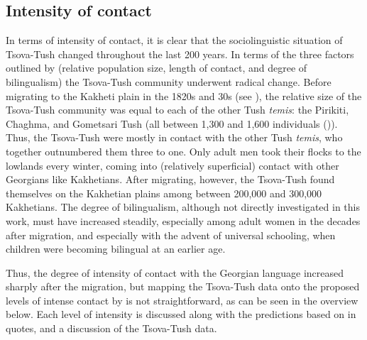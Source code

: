 \subsection{Intensity of contact}

In terms of intensity of contact, it is clear that the sociolinguistic situation of Tsova-Tush changed throughout the last 200 years. In terms of the three factors outlined by \textcite[63--74]{thomasonkaufman1988} (relative population size, length of contact, and degree of bilingualism) the Tsova-Tush community underwent radical change. Before migrating to the Kakheti plain in the 1820s and 30s (see ), the relative size of the Tsova-Tush community was equal to each of the other Tush \textit{temis}: the Pirikiti, Chaghma, and Gometsari Tush (all between 1,300 and 1,600 individuals (\cite{statistics1893})). Thus, the Tsova-Tush were mostly in contact with the other Tush \textit{temis}, who together outnumbered them three to one. Only adult men took their flocks to the lowlands every winter, coming into (relatively superficial) contact with other Georgians like Kakhetians. After migrating, however, the Tsova-Tush found themselves on the Kakhetian plains among between 200,000 and 300,000 Kakhetians. The degree of bilingualism, although not directly investigated in this work, must have increased steadily, especially among adult women in the decades after migration, and especially with the advent of universal schooling, when children were becoming bilingual at an earlier age.

Thus, the degree of intensity of contact with the Georgian language increased sharply after the migration, but mapping the Tsova-Tush data onto the proposed levels of intense contact by \textcite{thomasonkaufman1988} is not straightforward, as can be seen in the overview below. Each level of intensity is discussed along with the predictions based on \textcite{thomasonkaufman1988} in quotes, and a discussion of the Tsova-Tush data.


